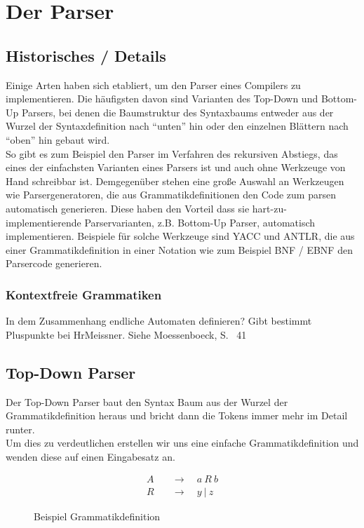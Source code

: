 \chapter{Der Parser}
\label{chap:theory:parser}

\section{Historisches / Details}

Einige Arten haben sich etabliert, um den Parser eines Compilers zu implementieren.
Die häufigsten davon sind Varianten des Top-Down und Bottom-Up Parsers, bei denen die Baumstruktur des Syntaxbaums entweder aus der Wurzel der Syntaxdefinition nach ``unten'' hin oder den einzelnen Blättern nach ``oben'' hin gebaut wird.\\
So gibt es zum Beispiel den Parser im Verfahren des rekursiven Abstiegs, das eines der einfachsten Varianten eines Parsers ist und auch ohne Werkzeuge von Hand schreibbar ist\cite{mossenbock:2024}.
Demgegenüber stehen eine große Auswahl an Werkzeugen wie Parsergeneratoren, die aus Grammatikdefinitionen den Code zum parsen automatisch generieren.
Diese haben den Vorteil dass sie hart-zu-implementierende Parservarianten, z.B. Bottom-Up Parser, automatisch implementieren.
Beispiele für solche Werkzeuge sind YACC und ANTLR, die aus einer Grammatikdefinition in einer Notation wie zum Beispiel BNF / EBNF den Parsercode generieren.


\subsection{Kontextfreie Grammatiken}

In dem Zusammenhang endliche Automaten definieren?
Gibt bestimmt Pluspunkte bei HrMeissner.
Siehe Moessenboeck, S. ~41


\section{Top-Down Parser}

Der Top-Down Parser baut den Syntax Baum aus der Wurzel der Grammatikdefinition heraus und bricht dann die Tokens immer mehr im Detail runter\cite{meduna2007elements}.\\
Um dies zu verdeutlichen erstellen wir uns eine einfache Grammatikdefinition und wenden diese auf einen Eingabesatz an.\\
\begin{figure}[H]
  \begin{align*}
    A &\quad\rightarrow\quad a\ R\ b \\
    R &\quad\rightarrow\quad y\ |\ z
  \end{align*}
  \caption{Beispiel Grammatikdefinition}
  \label{fig:theory:parser:topdown:grammar}
\end{figure}

